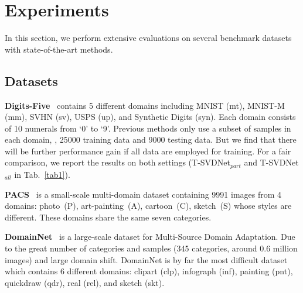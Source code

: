 \documentclass[10pt,twocolumn,letterpaper]{article}
\begin{document}
\section{Experiments}
In this section, we perform extensive evaluations on several benchmark datasets with state-of-the-art methods. 
\subsection{Datasets}
\textbf{Digits-Five}~\cite{hull1994database} contains 5 different domains including MNIST (mt), MNIST-M (mm), SVHN (sv), USPS (up), and Synthetic Digits (syn). Each domain consists of 10 numerals from `0' to `9'. Previous methods only use a subset of samples in each domain, \ie, 25000 training data and 9000 testing data. But we find that there will be further performance gain if all data are employed for training. For a fair comparison, we report the results on both settings (T-SVDNet$_{part}$ and T-SVDNet$_{all}$ in Tab.~\ref{tab1}).\par
\textbf{PACS}~\cite{li2017deeper} is a small-scale multi-domain dataset containing 9991 images from 4 domains: photo~(P), art-painting~(A), cartoon~(C), sketch~(S) whose styles are different. These domains share the same seven categories.\par
\textbf{DomainNet}~\cite{peng2019moment} is a large-scale dataset for Multi-Source Domain Adaptation. Due to the great number of categories and samples (345 categories, around 0.6 million images) and large domain shift. DomainNet is by far the most difficult dataset which contains 6 different domains: clipart (clp), infograph (inf), painting (pnt), quickdraw (qdr), real (rel), and sketch (skt).
\end{document}

